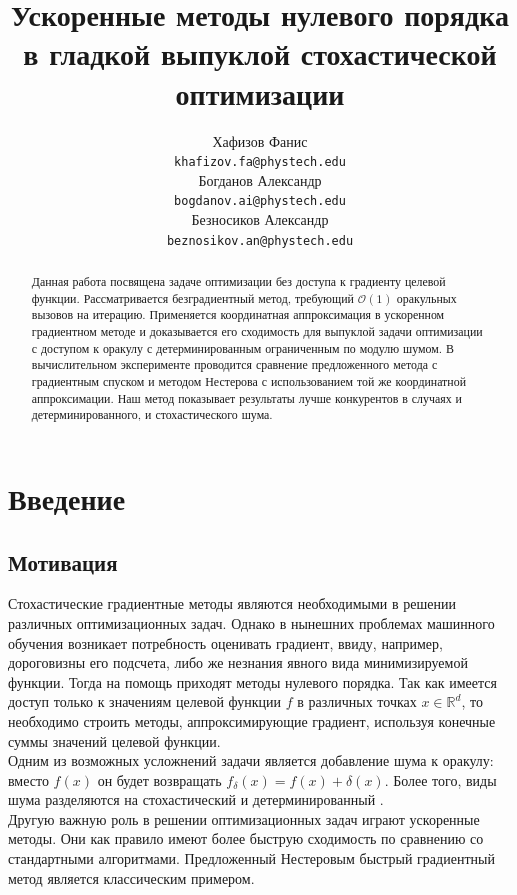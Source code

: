 \documentclass{article}
\title{Ускоренные методы нулевого порядка в гладкой выпуклой стохастической оптимизации}
\author{
	Хафизов Фанис \\
	\texttt{khafizov.fa@phystech.edu} \\
	\And
	Богданов Александр \\
	\texttt{bogdanov.ai@phystech.edu} \\
	\And
	Безносиков Александр \\
	\texttt{beznosikov.an@phystech.edu}
}
\date{}
\begin{document}
\maketitle

\begin{abstract}
Данная работа посвящена задаче оптимизации без доступа к градиенту целевой функции. Рассматривается безградиентный метод, требующий $\mathcal{O}(1)$ оракульных вызовов на итерацию. Применяется координатная аппроксимация в ускоренном градиентном методе и доказывается его сходимость для выпуклой задачи оптимизации с доступом к оракулу с детерминированным ограниченным по модулю шумом. В вычислительном эксперименте проводится сравнение предложенного метода с градиентным спуском и методом Нестерова с использованием той же координатной аппроксимации. Наш метод показывает результаты лучше конкурентов в случаях и детерминированного, и стохастического шума.
\end{abstract}


\section{Введение}
\subsection{Мотивация}
Стохастические градиентные методы являются необходимыми в решении различных оптимизационных задач. Однако в нынешних проблемах машинного обучения возникает потребность оценивать градиент, ввиду, например, дороговизны его подсчета, либо же незнания явного вида минимизируемой функции. Тогда на помощь приходят методы нулевого порядка. Так как имеется доступ только к значениям целевой функции $f$ в различных точках $x \in \mathbb{R}^d$, то необходимо строить методы, аппроксимирующие градиент, используя конечные суммы значений целевой функции.\\
Одним из возможных усложнений задачи является добавление шума к оракулу: вместо $f(x)$ он будет возвращать $f_\delta(x) = f(x) + \delta (x)$. Более того, виды шума разделяются на стохастический \cite{lucchi2022theoretical} и детерминированный \cite{lobanov2023zeroorder}.\\
Другую важную роль в решении оптимизационных задач играют ускоренные методы. Они как правило имеют более быструю сходимость по сравнению со стандартными алгоритмами. Предложенный Нестеровым \cite{Nesterov1983AMF} быстрый градиентный метод является классическим примером.
\end{document}
